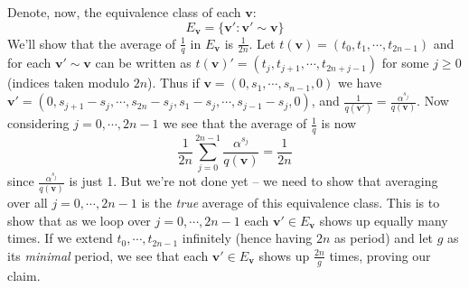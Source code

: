 \documentclass[11pt,a4paper]{article}
\newcommand{\<}{\langle}
\renewcommand{\>}{\rangle}
\begin{document}
\begin{enumerate}
	Denote, now, the equivalence class of each $\mathbf{v}$: 
	\[
	E_{\mathbf{v}} = \{\mathbf{v}': \mathbf{v'}\sim \mathbf{v}\}
	\]
	We'll show that the average of $\frac{1}{q}$ in $E_{\mathbf{v}}$ is $\frac{1}{2n}$. 
	Let $t(\mathbf{v})=(t_0,t_1,\cdots,t_{2n-1})$ and for each $\mathbf{v}'\sim\mathbf{v}$ can be written as 
	$t(\mathbf{v})'=(t_j,t_{j+1},\cdots,t_{2n+j-1})$ for some $j\ge 0$ (indices taken modulo $2n$). 
	Thus if $\mathbf{v}=(0, s_1, \cdots, s_{n-1}, 0)$ we have 
	$\mathbf{v}'=(0, s_{j+1}-s_j, \cdots, s_{2n}-s_j, s_1-s_j, \cdots, s_{j-1}-s_j, 0)$, 
	and $\frac{1}{q(\mathbf{v}')}=\frac{\alpha^{s_j}}{q(\mathbf{v})}$. 
	Now considering $j=0, \cdots, 2n-1$ we see that the average of $\frac{1}{q}$ is now 
	\[
	\frac{1}{2n}\sum_{j=0}^{2n-1}\frac{\alpha^{s_j}}{q(\mathbf{v})} = \frac{1}{2n}
	\]
	since $\frac{\alpha^{s_j}}{q(\mathbf{v})}$ is just 1. 
	But we're not done yet -- we need to show that averaging over all $j=0, \cdots, 2n-1$ is the \emph{true} average of this equivalence class. 
	This is to show that as we loop over $j=0, \cdots, 2n-1$ each $\mathbf{v}'\in E_{\mathbf{v}}$ shows up equally many times. 
	If we extend $t_0, \cdots, t_{2n-1}$ infinitely (hence having $2n$ as period) and let $g$ as its \emph{minimal} period, we see that each $\mathbf{v}'\in E_{\mathbf{v}}$ shows up $\frac{2n}{g}$ times, 
	proving our claim. 
	
\end{enumerate}
\end{document}
